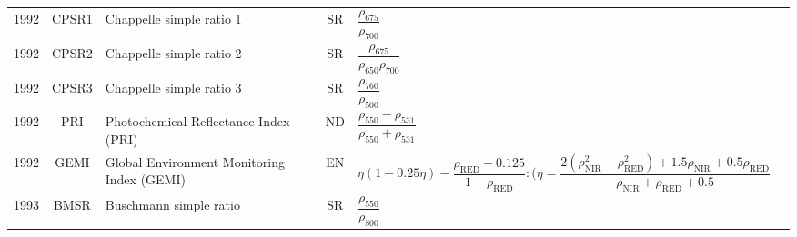 \documentclass[10pt]{article}
\begin{document}
\begin{ThreePartTable}
\begin{longtable}{c c m{2.3in} c M{2.8in} M{1.5in}}
  1992 & CPSR1   & Chappelle simple ratio 1                                                       & SR & $\dfrac{\rho_{675}}{\rho_{700}}$                                                                                                                                                                                                                                                        & \citet{Chappelle1992}                               \\
  1992 & CPSR2   & Chappelle simple ratio 2                                                       & SR & $\dfrac{\rho_{675}}{\rho_{650}\rho_{700}}$                                                                                                                                                                                                                                              & \citet{Chappelle1992}                               \\
  1992 & CPSR3   & Chappelle simple ratio 3                                                       & SR & $\dfrac{\rho_{760}}{\rho_{500}}$                                                                                                                                                                                                                                                        & \citet{Chappelle1992}                               \\
  1992 & PRI     & Photochemical Reflectance Index (PRI)                                          & ND & $\dfrac{\rho_{550}-\rho_{531}}{\rho_{550}+\rho_{531}}$                                                                                                                                                                                                                                  & \citet{Gamon1992}                                   \\
  1992 & GEMI    & Global Environment Monitoring Index (GEMI)                                     & EN & $\eta(1-0.25\eta)-\dfrac{\rho_\text{RED}-0.125}{1-\rho_\text{RED}}:(\eta=\dfrac{2(\rho_\text{NIR}^2-\rho_\text{RED}^2)+1.5\rho_\text{NIR}+0.5\rho_\text{RED}}{\rho_\text{NIR}+\rho_\text{RED}+0.5}$                                                                                     & \citet{Pinty1992}                                   \\
  1993 & BMSR    & Buschmann simple ratio                                                         & SR & $\dfrac{\rho_{550}}{\rho_{800}}$                                                                                                                                                                                                                                                        & \citet{Buschmann1993}                               \\

\end{longtable}
\end{ThreePartTable}
\end{document}
